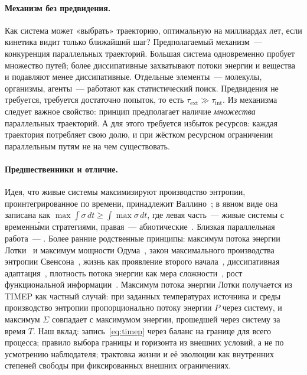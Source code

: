 \documentclass[11pt,a4paper]{article}
\begin{document}
\paragraph{Механизм без предвидения.}
Как система может «выбрать» траекторию, оптимальную на миллиардах лет, если кинетика видит только ближайший шаг? Предполагаемый механизм~--- конкуренция параллельных траекторий. Большая система одновременно пробует множество путей; более диссипативные захватывают потоки энергии и вещества и подавляют менее диссипативные. Отдельные элементы~--- молекулы, организмы, агенты~--- работают как статистический поиск. Предвидения не требуется, требуется достаточно попыток, то есть $\tau_{\mathrm{ext}}\gg\tau_{\mathrm{int}}$. Из механизма следует важное свойство: принцип предполагает наличие \emph{множества} параллельных траекторий. А для этого требуется избыток ресурсов: каждая траектория потребляет свою долю, и при жёстком ресурсном ограничении параллельным путям не на чем существовать.

\paragraph{Предшественники и отличие.}
Идея, что живые системы максимизируют производство энтропии, проинтегрированное по времени, принадлежит Валлино~\cite{vallino2010}; в явном виде она записана как $\max\!\int\!\sigma\,dt\ge\int\!\max\sigma\,dt$, где левая часть~--- живые системы с временны́ми стратегиями, правая~--- абиотические~\cite{vallino2020}. Близкая параллельная работа~--- \cite{newbury2026}. Более ранние родственные принципы: максимум потока энергии Лотки~\cite{lotka1922} и максимум мощности Одума~\cite{odum1988}, закон максимального производства энтропии Свенсона~\cite{swenson1989}, жизнь как проявление второго начала~\cite{schneider1994}, диссипативная адаптация~\cite{england2013,england2015}, плотность потока энергии как мера сложности~\cite{chaisson2011}, рост функциональной информации~\cite{wong2023}. Максимум потока энергии Лотки получается из TIMEP как частный случай: при заданных температурах источника и среды производство энтропии пропорционально потоку энергии $P$ через систему, и максимум $\Sigma$ совпадает с максимумом энергии, прошедшей через систему за время $T$. Наш вклад: запись~\eqref{eq:timep} через баланс на границе для всего процесса; правило выбора границы и горизонта из внешних условий, а не по усмотрению наблюдателя; трактовка жизни и её эволюции как внутренних степеней свободы при фиксированных внешних ограничениях.
\end{document}
